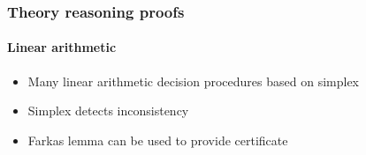 \documentclass[svgnames,table,mathserif]{beamer}
\begin{document}
\begin{frame}
  \frametitle{Theory reasoning proofs}
  \framesubtitle{Linear arithmetic}

  \begin{itemize}
  \item Many linear arithmetic decision procedures based on simplex
  \item Simplex detects inconsistency
  \item Farkas lemma can be used to provide certificate
  \end{itemize}

\begin{minipage}{.4\textwidth}
  \begin{center}
%
%

\end{center}
\end{minipage}
\end{frame}
\end{document}
